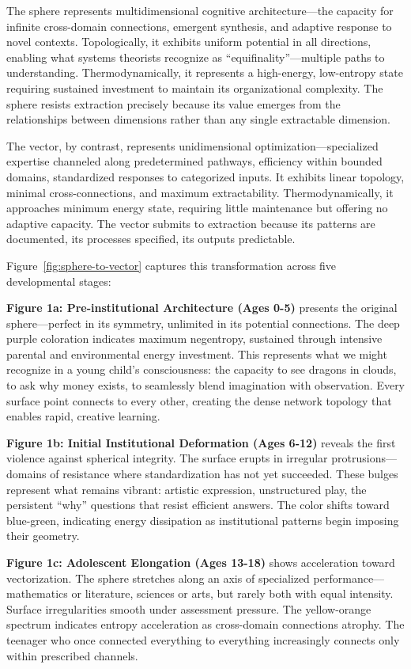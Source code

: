The sphere represents multidimensional cognitive architecture---the capacity for infinite cross-domain connections, emergent synthesis, and adaptive response to novel contexts. Topologically, it exhibits uniform potential in all directions, enabling what systems theorists recognize as ``equifinality''---multiple paths to understanding. Thermodynamically, it represents a high-energy, low-entropy state requiring sustained investment to maintain its organizational complexity. The sphere resists extraction precisely because its value emerges from the relationships between dimensions rather than any single extractable dimension.

The vector, by contrast, represents unidimensional optimization---specialized expertise channeled along predetermined pathways, efficiency within bounded domains, standardized responses to categorized inputs. It exhibits linear topology, minimal cross-connections, and maximum extractability. Thermodynamically, it approaches minimum energy state, requiring little maintenance but offering no adaptive capacity. The vector submits to extraction because its patterns are documented, its processes specified, its outputs predictable.

Figure~\ref{fig:sphere-to-vector} captures this transformation across five developmental stages:

\textbf{Figure 1a: Pre-institutional Architecture (Ages 0-5)} presents the original sphere---perfect in its symmetry, unlimited in its potential connections. The deep purple coloration indicates maximum negentropy, sustained through intensive parental and environmental energy investment. This represents what we might recognize in a young child's consciousness: the capacity to see dragons in clouds, to ask why money exists, to seamlessly blend imagination with observation. Every surface point connects to every other, creating the dense network topology that enables rapid, creative learning.

\textbf{Figure 1b: Initial Institutional Deformation (Ages 6-12)} reveals the first violence against spherical integrity. The surface erupts in irregular protrusions---domains of resistance where standardization has not yet succeeded. These bulges represent what remains vibrant: artistic expression, unstructured play, the persistent ``why'' questions that resist efficient answers. The color shifts toward blue-green, indicating energy dissipation as institutional patterns begin imposing their geometry.

\textbf{Figure 1c: Adolescent Elongation (Ages 13-18)} shows acceleration toward vectorization. The sphere stretches along an axis of specialized performance---mathematics or literature, sciences or arts, but rarely both with equal intensity. Surface irregularities smooth under assessment pressure. The yellow-orange spectrum indicates entropy acceleration as cross-domain connections atrophy. The teenager who once connected everything to everything increasingly connects only within prescribed channels.

